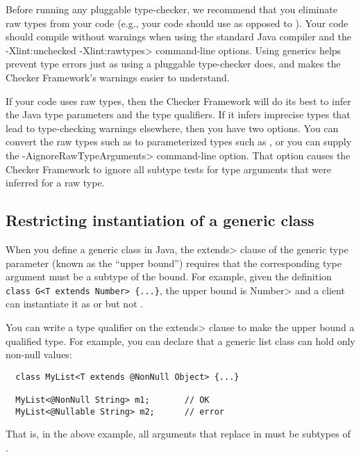 Before running any pluggable type-checker, we recommend that you eliminate
raw types from your code (e.g., your code should use  as
opposed to ).
Your code should compile without warnings when using the standard Java
compiler and the \<-Xlint:unchecked -Xlint:rawtypes> command-line options.
Using generics helps prevent type errors just as using a pluggable
type-checker does, and makes the Checker Framework's warnings easier to
understand.

If your code uses raw types, then the Checker Framework will do its best to
infer the Java type parameters and the type qualifiers.  If it infers
imprecise types that lead to type-checking warnings elsewhere, then you have
two options.  You can convert the raw types such as  to
parameterized types such as , or you can supply the 
\<-AignoreRawTypeArguments> command-line option.  That option causes the
Checker Framework to ignore all subtype tests for type arguments that
were inferred for a raw type.


\subsection{Restricting instantiation of a generic class\label{generics-instantiation}}

When you define a generic class in Java, the \<extends> clause
of the generic type parameter (known as the ``upper bound'') requires that
the corresponding type argument must be a subtype of the bound.
For example, given the definition
\verb|class G<T extends Number> {...}|,
the upper bound is \<Number>
and a client can instantiate it as  or 
but not .

You can write a type qualifier on the \<extends> clause to make the upper
bound a qualified type.  For example, you can declare that a generic list class can hold only non-null values:

\begin{Verbatim}
  class MyList<T extends @NonNull Object> {...}

  MyList<@NonNull String> m1;       // OK
  MyList<@Nullable String> m2;      // error
\end{Verbatim}

That is, in the above example, all
arguments that replace  in  must be subtypes of
.

